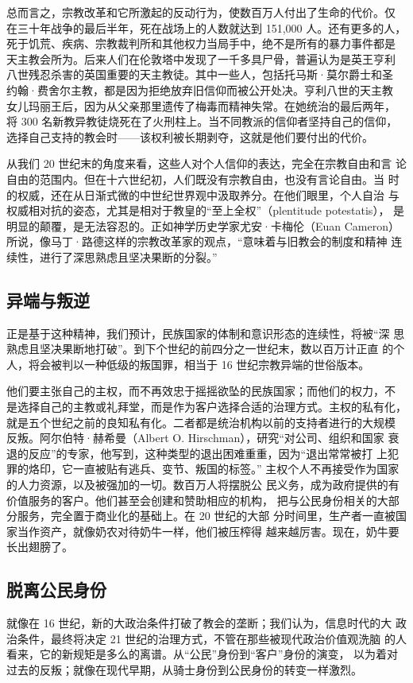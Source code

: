 总而言之，宗教改革和它所激起的反动行为，使数百万人付出了生命的代价。仅 在三十年战争的最后半年，死在战场上的人数就达到 151,000 人。还有更多的人， 死于饥荒、疾病、宗教裁判所和其他权力当局手中，绝不是所有的暴力事件都是 天主教会所为。后来人们在伦敦塔中发现了一千多具尸骨，普遍认为是英王亨利 八世残忍杀害的英国重要的天主教徒。其中一些人，包括托马斯·莫尔爵士和圣 约翰·费舍尔主教，都是因为拒绝放弃旧信仰而被公开处决。亨利八世的天主教 女儿玛丽王后，因为从父亲那里遗传了梅毒而精神失常。在她统治的最后两年， 将 300 名新教异教徒烧死在了火刑柱上。当不同教派的信仰者坚持自己的信仰， 选择自己支持的教会时——该权利被长期剥夺，这就是他们要付出的代价。

从我们 20 世纪末的角度来看，这些人对个人信仰的表达，完全在宗教自由和言 论自由的范围内。但在十六世纪初，人们既没有宗教自由，也没有言论自由。当  时的权威，还在从日渐式微的中世纪世界观中汲取养分。在他们眼里，个人自治 与权威相对抗的姿态，尤其是相对于教皇的“至上全权”（plentitude potestatis）， 是明显的颠覆，是无法容忍的。正如神学历史学家尤安·卡梅伦（Euan Cameron） 所说，像马丁·路德这样的宗教改革家的观点，“意味着与旧教会的制度和精神 连续性，进行了深思熟虑且坚决果断的分裂。” 

\subsection{异端与叛逆}
正是基于这种精神，我们预计，民族国家的体制和意识形态的连续性，将被“深 思熟虑且坚决果断地打破”。到下个世纪的前四分之一世纪末，数以百万计正直 的个人，将会被判以一种低级的叛国罪，相当于 16 世纪宗教异端的世俗版本。

他们要主张自己的主权，而不再效忠于摇摇欲坠的民族国家；而他们的权力，不 是选择自己的主教或礼拜堂，而是作为客户选择合适的治理方式。主权的私有化， 就是五个世纪之前的良知私有化。二者都是统治机构以前的支持者进行的大规模 反叛。阿尔伯特·赫希曼（Albert O. Hirschman），研究“对公司、组织和国家 衰退的反应”的专家，他写到，这种类型的退出困难重重，因为“退出常常被打 上犯罪的烙印，它一直被贴有逃兵、变节、叛国的标签。” 主权个人不再接受作为国家的人力资源，以及被强加的一切。数百万人将摆脱公 民义务，成为政府提供的有价值服务的客户。他们甚至会创建和赞助相应的机构， 把与公民身份相关的大部分服务，完全置于商业化的基础上。在 20 世纪的大部 分时间里，生产者一直被国家当作资产，就像奶农对待奶牛一样，他们被压榨得 越来越厉害。现在，奶牛要长出翅膀了。

\subsection{脱离公民身份}
就像在 16 世纪，新的大政治条件打破了教会的垄断；我们认为，信息时代的大 政治条件，最终将决定 21 世纪的治理方式，不管在那些被现代政治价值观洗脑 的人看来，它的新规矩是多么的离谱。从“公民”身份到“客户”身份的演变， 以为着对过去的反叛；就像在现代早期，从骑士身份到公民身份的转变一样激烈。

